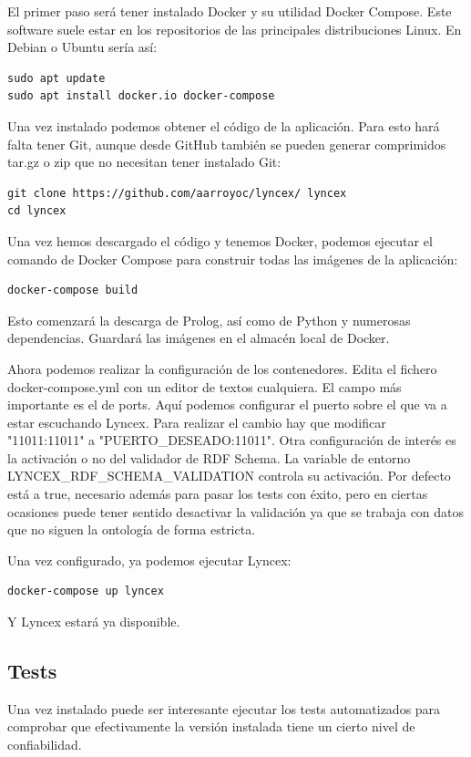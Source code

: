 \documentclass[12pt]{report} %
\begin{document}
El primer paso será tener instalado Docker y su utilidad Docker Compose. Este software suele estar en los repositorios de las principales distribuciones Linux. En Debian o Ubuntu sería así:
\begin{verbatim}
sudo apt update
sudo apt install docker.io docker-compose
\end{verbatim}

Una vez instalado podemos obtener el código de la aplicación. Para esto hará falta tener Git, aunque desde GitHub también se pueden generar comprimidos tar.gz o zip que no necesitan tener instalado Git:
\begin{verbatim}
git clone https://github.com/aarroyoc/lyncex/ lyncex
cd lyncex
\end{verbatim}

Una vez hemos descargado el código y tenemos Docker, podemos ejecutar el comando de Docker Compose para construir todas las imágenes de la aplicación:
\begin{verbatim}
docker-compose build
\end{verbatim}

Esto comenzará la descarga de Prolog, así como de Python y numerosas dependencias. Guardará las imágenes en el almacén local de Docker. 

Ahora podemos realizar la configuración de los contenedores. Edita el fichero docker-compose.yml con un editor de textos cualquiera. El campo más importante es el de ports. Aquí podemos configurar el puerto sobre el que va a estar escuchando Lyncex. Para realizar el cambio hay que modificar "11011:11011" a "PUERTO\_DESEADO:11011". Otra configuración de interés es la activación o no del validador de RDF Schema. La variable de entorno LYNCEX\_RDF\_SCHEMA\_VALIDATION controla su activación. Por defecto está a true, necesario además para pasar los tests con éxito, pero en ciertas ocasiones puede tener sentido desactivar la validación ya que se trabaja con datos que no siguen la ontología de forma estricta.

Una vez configurado, ya podemos ejecutar Lyncex:
\begin{verbatim}
docker-compose up lyncex
\end{verbatim}
Y Lyncex estará ya disponible.

\subsection{Tests}

Una vez instalado puede ser interesante ejecutar los tests automatizados para comprobar que efectivamente la versión instalada tiene un cierto nivel de confiabilidad.
\end{document}

